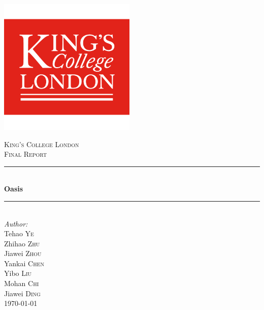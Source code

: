 \documentclass[12pt,a4]{article}
\newcommand{\HRule}{\rule{\linewidth}{0.5mm}}
\begin{document}
\begin{titlepage}

\begin{center}


\includegraphics[width=0.49\textwidth]{figure/title}

\textsc{\LARGE King's College London}\\[0.8cm]

\textsc{\Large Final Report}\\[0.4cm]


\HRule \\[0.2cm]
{ \huge \bfseries  Oasis}\\[0.2cm]

\HRule \\[0.6cm]


\large
\emph{Author:}\\[0.2cm]
Tehao \textsc{Ye}\\
Zhihao \textsc{Zhu}\\
Jiawei \textsc{Zhou}\\
Yankai \textsc{Chen}\\
Yibo \textsc{Liu}\\
Mohan \textsc{Chi}\\
Jiawei \textsc{Ding}\\[0.8cm]


{\large \today}

\end{center}
\end{titlepage}
\clearpage
\tableofcontents
\clearpage
\end{document}
